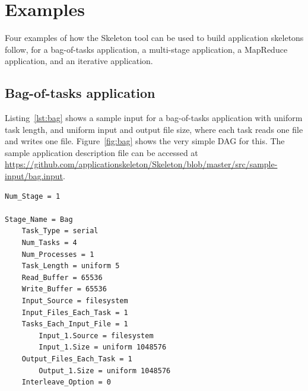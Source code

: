 \documentclass[10pt,a4paper]{article}
\begin{document}
\section{Examples}

Four examples of how the Skeleton tool can be used to build application skeletons follow, for a bag-of-tasks application, a multi-stage application, a MapReduce application, and an iterative application.  


\subsection{Bag-of-tasks application}

Listing~\ref{lst:bag} shows a sample input for a bag-of-tasks application with uniform task length, and uniform input and output file size, where each task reads one file and writes one file. Figure~\ref{fig:bag} shows the very simple DAG for this. The sample application description file can be accessed at \url{https://github.com/applicationskeleton/Skeleton/blob/master/src/sample-input/bag.input}.

\begin{lstlisting}[caption=Sample input for a bag-of-tasks application, label=lst:bag, linewidth=1.0\textwidth, xleftmargin=2.5ex]
Num_Stage = 1

Stage_Name = Bag
    Task_Type = serial
    Num_Tasks = 4  
    Num_Processes = 1
    Task_Length = uniform 5
    Read_Buffer = 65536
    Write_Buffer = 65536
    Input_Source = filesystem
    Input_Files_Each_Task = 1
    Tasks_Each_Input_File = 1
    	Input_1.Source = filesystem
    	Input_1.Size = uniform 1048576
    Output_Files_Each_Task = 1
        Output_1.Size = uniform 1048576
    Interleave_Option = 0    

\end{lstlisting}
\end{document}

